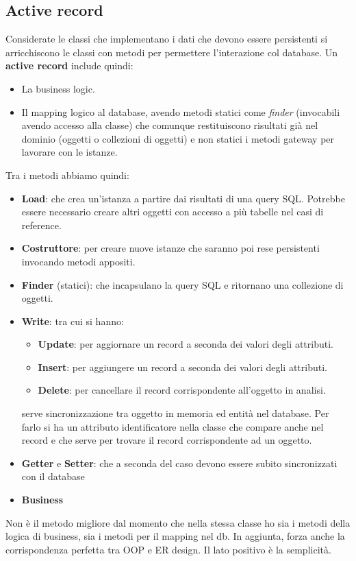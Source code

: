 \subsection{Active record}
Considerate le classi che implementano i dati che devono essere persistenti si
arricchiscono le classi con metodi per permettere l'interazione col database. Un
\textbf{active record} include quindi:
\begin{itemize}
    \item La business logic.
    \item Il mapping logico al database, avendo  metodi statici come \textit{finder}
          (invocabili avendo accesso alla classe) che comunque restituiscono risultati
          già nel dominio (oggetti o collezioni di oggetti) e non statici i metodi gateway per lavorare con le istanze.
\end{itemize}
Tra i metodi abbiamo quindi:
\begin{itemize}
    \item \textbf{Load}: che crea un'istanza a partire dai risultati di una query
          SQL. Potrebbe essere necessario creare altri oggetti con accesso a più tabelle
          nel casi di reference.
    \item \textbf{Costruttore}: per creare nuove istanze che saranno poi rese
          persistenti invocando metodi appositi.
    \item \textbf{Finder} (statici): che incapsulano la query SQL e ritornano una
          collezione di oggetti.
    \item \textbf{Write}: tra cui si hanno:
          \begin{itemize}
              \item \textbf{Update}: per aggiornare un record a seconda dei valori degli attributi.
              \item \textbf{Insert}: per aggiungere un record a seconda dei valori degli attributi.
              \item \textbf{Delete}: per cancellare il record corrispondente all'oggetto in analisi.
          \end{itemize}
          serve sincronizzazione tra oggetto in memoria ed entità nel database.
          Per farlo si ha un attributo identificatore nella classe che compare anche
          nel record e che serve per trovare il record corrispondente ad un oggetto.
    \item \textbf{Getter} e \textbf{Setter}: che a seconda del caso devono essere
          subito sincronizzati con il database
    \item \textbf{Business}
\end{itemize}
Non è il metodo migliore dal momento che nella stessa classe ho sia i metodi 
della logica di business, sia i metodi per il mapping nel db. In aggiunta, forza 
anche la corrispondenza perfetta tra OOP e ER design. Il lato positivo è la 
semplicità.
	
